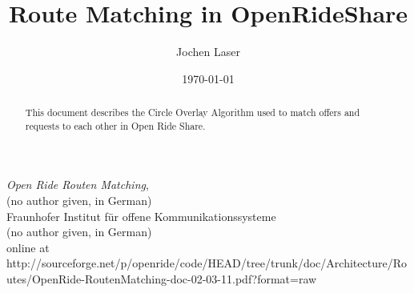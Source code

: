 \documentclass[12pt, a4paper, twoside, titlepage]{report}
\title{Route Matching in OpenRideShare}
\author{Jochen Laser}
\date{\today}
\begin{document}
\maketitle


\begin{abstract}
This document describes the Circle Overlay Algorithm used to match offers
and requests to each other in Open Ride Share.
\end{abstract}

\tableofcontents %








\begin{thebibliography}{9}
 \emph{Open Ride Routen Matching},\\
(no author given, in German)\\ 
Fraunhofer Institut f\"ur offene Kommunikationssysteme\\
(no author given, in German)\\ 
online at 
http://sourceforge.net/p/openride/code/HEAD/tree/trunk/doc/Architecture/Routes/OpenRide-RoutenMatching-doc-02-03-11.pdf?format=raw
\end{thebibliography}

\clearpage
{}
\printindex
\end{document}
